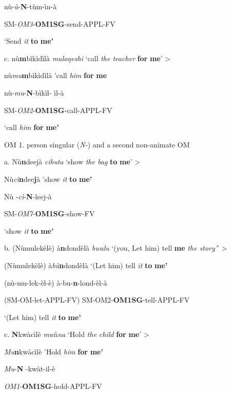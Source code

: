 \documentclass[output=paper]{langscibook}
\begin{document}
nù-\textit{ù}{}-\textbf{N}{}-tùm-ìn-à  

SM-\textit{OM3}{}-\textbf{OM1SG}{}-send-APPL-FV  

\glt ‘Send \textit{it} \textbf{to} \textbf{me’}

c.  nù\textbf{m}b{ì}k{ì}d{ì}là    \textit{muloŋeshi}   ‘call \textit{the teacher} \textbf{for} \textbf{me}’    >

nù\textit{mu}\textbf{m}b{ì}k{ì}d{ì}là            ’call \textit{him} \textbf{for} \textbf{me}

nù-\textit{mu}{}-\textbf{N}{}-b{ì}k{ì}l-  {ì}l-à

SM-\textit{OM2}{}-\textbf{OM1SG}{}-call-APPL-FV  

\glt ‘call \textit{him} \textbf{for} \textbf{me’}

\ea%
    \label{ex:lukusa:33}
    \z

         OM 1. person singular (\textit{N-}) and a second non-animate OM 

a.  Nù\textbf{n}deejà    \textit{cibuta}        ‘show \textit{the bag} \textbf{to} \textbf{me}’    >  

Nù\textit{c}{\textit{ì}}\textbf{n}dee\textbf{j}à                ’show \textit{it} \textbf{to} \textbf{me’}

Nù  {}-\textit{c}{\textit{ì}}{}-\textbf{N}{}-leej-à

SM-\textit{OM7}{}-\textbf{OM1SG}{}-show-FV    

\glt ‘show \textit{it} \textbf{to} \textbf{me’}

b.  (Nùmulekèlè) à\textbf{n}dondèlà    \textit{bwalu}  ‘(you, Let him) tell \textbf{me} \textit{the story’}’  >  

(Nùmulekèlè) à\textit{bù}\textbf{n}dondèlà        ‘(Let him) tell \textit{it} \textbf{to} \textbf{me’}      

(nù-mu-lek-èl-è)        à-bu-\textbf{n}{}-lond-èl-à              

(SM-OM-let-APPL-FV)    SM-OM2-\textbf{OM1SG}{}-tell-APPL-FV    

\glt ‘(Let him) tell \textit{it} \textbf{to} \textbf{me’}

c.  \textbf{N}kwàc{ì}lè   \textit{mw}{â}\textit{na}            ‘Hold \textit{the child} \textbf{for} \textbf{me}’  >

\textit{Mu}\textbf{n}kwàc{ì}lè                ’Hold \textit{him} \textbf{for} \textbf{me’}

\textit{Mu}{}-\textbf{N}  {}-kwàt-il-è  

\textit{OM1}{}-\textbf{OM1SG}{}-hold{}-APPL{}-FV    
\end{document}
